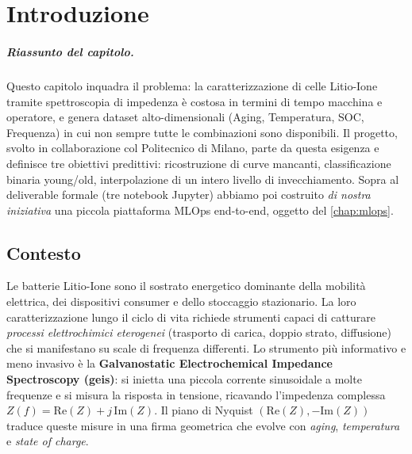 \chapter{Introduzione}
\label{chap:introduction}

\paragraph{Riassunto del capitolo.} Questo capitolo inquadra il
problema: la caratterizzazione di celle Litio-Ione tramite spettroscopia
di impedenza è costosa in termini di tempo macchina e operatore, e
genera dataset alto-dimensionali (Aging, Temperatura, SOC, Frequenza)
in cui non sempre tutte le combinazioni sono disponibili. Il progetto,
svolto in collaborazione col Politecnico di Milano, parte da questa
esigenza e definisce tre obiettivi predittivi: ricostruzione di curve
mancanti, classificazione binaria young/old, interpolazione di un
intero livello di invecchiamento. Sopra al deliverable formale (tre
notebook Jupyter) abbiamo poi costruito \emph{di nostra iniziativa}
una piccola piattaforma MLOps end-to-end, oggetto del
\cref{chap:mlops}.

\section{Contesto}

Le batterie Litio-Ione sono il sostrato energetico dominante della
mobilità elettrica, dei dispositivi consumer e dello stoccaggio
stazionario. La loro caratterizzazione lungo il ciclo di vita richiede
strumenti capaci di catturare \emph{processi elettrochimici eterogenei}
(trasporto di carica, doppio strato, diffusione) che si manifestano su
scale di frequenza differenti. Lo strumento più informativo e meno
invasivo è la \textbf{Galvanostatic Electrochemical Impedance
Spectroscopy (\acrshort{geis})}: si inietta una piccola corrente
sinusoidale a molte frequenze e si misura la risposta in tensione,
ricavando l'impedenza complessa
$Z(f) = \mathrm{Re}(Z) + j\,\mathrm{Im}(Z)$. Il piano di Nyquist
$(\mathrm{Re}(Z), -\mathrm{Im}(Z))$ traduce queste misure in una firma
geometrica che evolve con \emph{aging}, \emph{temperatura} e \emph{state
of charge}.

